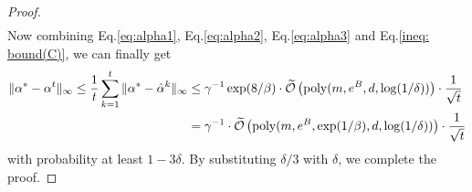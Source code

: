 \begin{proof}
\begin{align}
    \end{align}
    Now combining Eq.\eqref{eq:alpha1}, Eq.\eqref{eq:alpha2}, Eq.\eqref{eq:alpha3} and Eq.\eqref{ineq: bound(C)}, we can finally get 
    \begin{align*}
        \|\alpha^* - \alpha^t\|_\infty \le \frac{1}{t}\sum_{k=1}^{t}\|\alpha^* - \hat{\alpha}^k\|_\infty&\le \gamma^{-1}\exp(8/\beta)\cdot \widetilde{\mathcal{O}}\left(\mathrm{poly}(m,e^B, d,\log(1/\delta))\right)\cdot \frac{1}{\sqrt{t}}\\
        &=\gamma^{-1}\cdot \widetilde{\mathcal{O}}\left(\mathrm{poly}(m,e^B, \exp(1/\beta),d,\log(1/\delta))\right)\cdot \frac{1}{\sqrt{t}}
    \end{align*}
    with probability at least $1-3\delta$. By substituting $\delta/3$ with $\delta$, we complete the proof.
 \end{proof}
   


